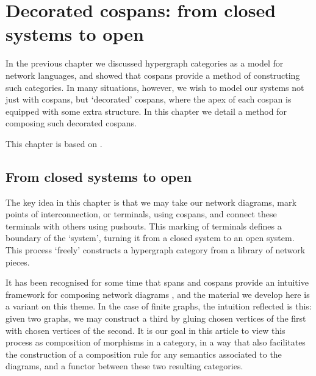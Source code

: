 \chapter{Decorated cospans: from closed systems to open}

In the previous chapter we discussed hypergraph categories as a model for
network languages, and showed that cospans provide a method of constructing such
categories. In many situations, however, we wish to model our systems not just
with cospans, but `decorated' cospans, where the apex of each cospan is equipped
with some extra structure. In this chapter we detail a method for composing such
decorated cospans. 


This chapter is based on \cite{fong_decorated_2015}.


\section{From closed systems to open}

The key idea in this chapter is that we may take our network diagrams, mark
points of interconnection, or terminals, using cospans, and connect these
terminals with others using pushouts. This marking of terminals defines a
boundary of the `system', turning it from a closed system to an open system.
This process `freely' constructs a hypergraph category from a library of network
pieces.

It has been recognised for some time that spans and cospans provide an intuitive
framework for composing network diagrams \cite{KSW}, and the material we develop
here is a variant on this theme. In the case of finite graphs, the intuition
reflected is this: given two graphs, we may construct a third by gluing chosen
vertices of the first with chosen vertices of the second. It is our goal in this
article to view this process as composition of morphisms in a category, in a way
that also facilitates the construction of a composition rule for any semantics
associated to the diagrams, and a functor between these two resulting
categories.

